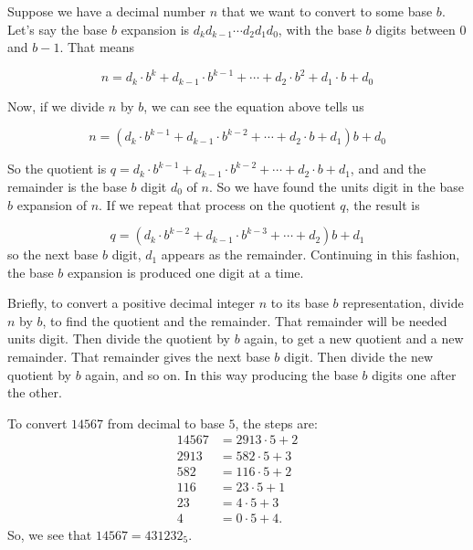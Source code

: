 Suppose we have a decimal number $n$ that we want to convert to some base $b$.
Let's say the base $b$ expansion is $d_kd_{k-1}\cdots d_2d_1d_0$, with the
base $b$ digits between $0$ and $b-1$.
That means

$$
n =  d_k\cdot b^k+d_{k-1}\cdot b^{k-1}+\cdots+ d_2\cdot b^2+d_1\cdot b+ d_0
$$

Now, if we divide $n$ by $b$, we can see the equation above tells us

$$
n =  (d_k\cdot b^{k-1}+d_{k-1}\cdot b^{k-2}+\cdots+ d_2\cdot b+d_1) b+ d_0
$$

So the quotient is $q=d_k\cdot b^{k-1}+d_{k-1}\cdot b^{k-2}+\cdots+ d_2\cdot b+d_1$, and
and the remainder is the base $b$ digit $d_0$ of $n$. So we have found the units digit
in the base $b$ expansion of $n$. If we repeat that process on the quotient $q$, the result
is 

$$
q =  (d_k\cdot b^{k-2}+d_{k-1}\cdot b^{k-3}+\cdots+ d_2) b+ d_1
$$
so the next base $b$ digit, $d_1$ appears as the remainder. Continuing in this fashion,
the base $b$ expansion is produced one digit at a time.

Briefly, to convert a positive
decimal integer $n$ to its base $b$ representation, divide $n$ by $b$,
to find the quotient and the remainder.  That remainder will be needed units
digit.  Then divide the quotient by $b$ again, to get a new
quotient and a new remainder. That remainder gives the next base $b$
digit. Then divide the new quotient by $b$ again,  and so on. In this way 
producing the
base $b$ digits  one after the other. 
\ms

\begin{exmp}
To convert $14567$ from decimal to base $5$, the steps are:
\begin{align*}
 14567 & =2913\cdot 5 + 2 \\
 2913 &= 582\cdot 5 + 3 \\
 582 & = 116\cdot 5 + 2  \\
 116 & = 23\cdot 5 + 1 \\
 23 & = 4\cdot 5 + 3 \\
 4 & = 0\cdot 5 + 4.
\end{align*}
So, we see that $14567=431232_5$.
\end{exmp}

